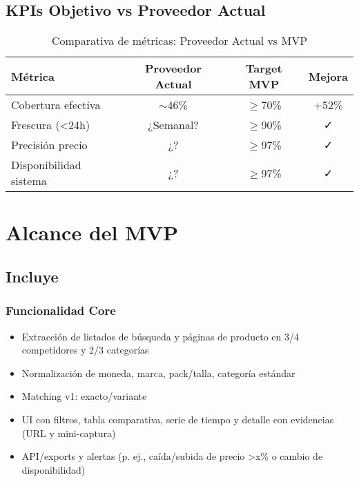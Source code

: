 \documentclass[12pt,a4paper]{article}
\begin{document}
\subsection{KPIs Objetivo vs Proveedor Actual}

\begin{table}[h]
\centering
\begin{tabularx}{\textwidth}{|X|c|c|c|}
\hline
\textbf{Métrica} & \textbf{Proveedor Actual} & \textbf{Target MVP} & \textbf{Mejora} \\
\hline
Cobertura efectiva & $\sim$46\% & $\geq$70\% & +52\% \\
\hline
Frescura (<24h) & ¿Semanal? & $\geq$90\% & \textcolor{successgreen}{✓} \\
\hline
Precisión precio & ¿? & $\geq$97\% & \textcolor{successgreen}{✓} \\
\hline
Disponibilidad sistema & ¿? & $\geq$97\% & \textcolor{successgreen}{✓} \\
\hline
\end{tabularx}
\caption{Comparativa de métricas: Proveedor Actual vs MVP}
\end{table}

\section{Alcance del MVP}

\subsection{Incluye}

\subsubsection*{Funcionalidad Core}
\begin{itemize}[leftmargin=*]
    \item Extracción de listados de búsqueda y páginas de producto en 3/4 competidores y 2/3 categorías
    \item Normalización de moneda, marca, pack/talla, categoría estándar
    \item Matching v1: exacto/variante
    \item UI con filtros, tabla comparativa, serie de tiempo y detalle con evidencias (URL y mini-captura)
    \item API/exports y alertas (p. ej., caída/subida de precio >x\% o cambio de disponibilidad)
\end{itemize}
\end{document}
